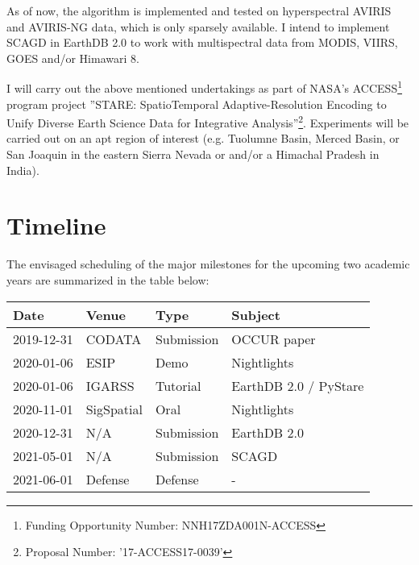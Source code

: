 \documentclass[letterpaper, parskip=half]{scrartcl}
\begin{document}
 
As of now, the algorithm is implemented and tested on hyperspectral \gls{AVIRIS} and \gls{AVIRIS-NG} data, which is only sparsely available. I intend to implement \gls{SCAGD} in EarthDB 2.0 to work with multispectral data from \gls{MODIS}, \gls{VIIRS}, \gls{GOES} and/or Himawari 8.

I will carry out the above mentioned undertakings as part of NASA's \gls{ACCESS}\footnote{Funding Opportunity Number: NNH17ZDA001N-ACCESS} program project ''STARE: SpatioTemporal Adaptive-Resolution Encoding to Unify Diverse Earth Science Data for Integrative Analysis''\footnote{Proposal Number: '17-ACCESS17-0039'}. Experiments will be carried out on an apt region of interest (e.g. Tuolumne Basin, Merced Basin, or San Joaquin in the eastern Sierra Nevada or and/or a Himachal Pradesh in India). 


\newpage
\section{Timeline}

The envisaged scheduling of the major milestones for the upcoming two academic years are summarized in the table below:

\begin{table}[ht]
 \centering


\begin{tabular}{l l l l}
\toprule
    Date        & Venue            & Type       & Subject                           \\ \midrule
    2019-12-31  & CODATA           & Submission & OCCUR paper                       \\
    2020-01-06  & ESIP             & Demo       & Nightlights 	                    \\
    2020-01-06  & IGARSS           & Tutorial   & EarthDB 2.0 / PyStare             \\
    2020-11-01  & SigSpatial	   & Oral       & Nightlights 	                    \\
    2020-12-31  & N/A              & Submission & EarthDB 2.0                       \\
    2021-05-01  & N/A              & Submission & SCAGD                             \\
    2021-06-01  & Defense	       & Defense    &  -                                \\
\bottomrule
    
    
\end{tabular}
\end{table}
\end{document}
